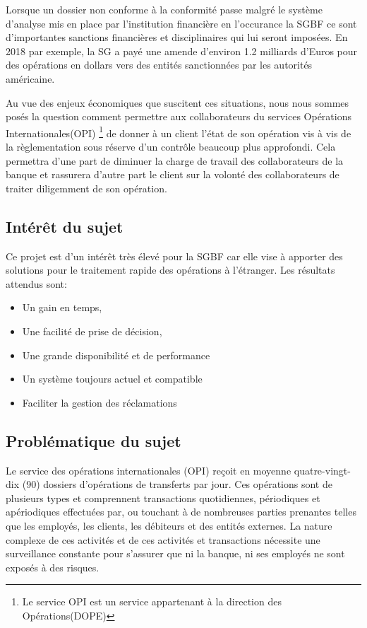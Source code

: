 Lorsque un dossier non conforme à la conformité passe malgré le système d'analyse
mis en place par l'institution financière en l'occurance la SGBF ce sont 
d'importantes sanctions financières et disciplinaires qui lui seront imposées.
En 2018 par exemple, la SG a payé une amende d'environ 1.2 milliards d'Euros 
pour des opérations en dollars vers des entités sanctionnées par les autorités 
américaine.

Au vue des enjeux économiques que suscitent ces situations, nous nous sommes 
posés la question comment permettre aux collaborateurs du services Opérations
Internationales(OPI) \footnote{Le service OPI est un service appartenant à la
direction des Opérations(DOPE)}
 de donner à un client l’état de son opération
vis à vis de la règlementation sous réserve d'un contrôle beaucoup plus approfondi. 
Cela permettra d'une part de diminuer la charge de travail des collaborateurs de la banque
et rassurera d'autre part le client sur la volonté des collaborateurs de 
traiter diligemment de son opération.

\subsection{Intérêt du sujet}
 
Ce projet est d’un intérêt très élevé pour la SGBF car elle vise à
apporter des solutions pour le traitement rapide des opérations à l'étranger.
Les résultats attendus sont:
\begin{itemize}
  \item Un gain en temps,
  \item Une facilité de prise de décision,
  \item Une grande disponibilité et de performance 
  \item Un système toujours actuel et compatible
  \item Faciliter la gestion des réclamations
\end{itemize}

    \subsection{Problématique du sujet}

Le service des opérations internationales (OPI) reçoit en moyenne quatre-vingt-dix
(90) dossiers d’opérations de transferts par jour. Ces opérations sont de
plusieurs types et comprennent transactions quotidiennes, périodiques et 
apériodiques effectuées par, ou touchant à de nombreuses parties prenantes
telles que les employés, les clients, les débiteurs et des entités externes.
La nature complexe de ces activités et de ces activités et transactions 
nécessite une surveillance constante pour s’assurer que ni la banque, ni
ses employés ne sont exposés à des risques.

